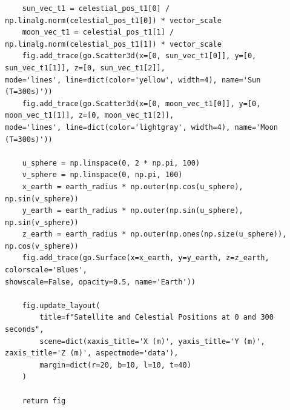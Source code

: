 \documentclass[11pt]{article}
\begin{document}
\begin{Verbatim}
    sun_vec_t1 = celestial_pos_t1[0] / np.linalg.norm(celestial_pos_t1[0]) * vector_scale
    moon_vec_t1 = celestial_pos_t1[1] / np.linalg.norm(celestial_pos_t1[1]) * vector_scale
    fig.add_trace(go.Scatter3d(x=[0, sun_vec_t1[0]], y=[0, sun_vec_t1[1]], z=[0, sun_vec_t1[2]],
mode='lines', line=dict(color='yellow', width=4), name='Sun (T=300s)'))
    fig.add_trace(go.Scatter3d(x=[0, moon_vec_t1[0]], y=[0, moon_vec_t1[1]], z=[0, moon_vec_t1[2]],
mode='lines', line=dict(color='lightgray', width=4), name='Moon (T=300s)'))

    u_sphere = np.linspace(0, 2 * np.pi, 100)
    v_sphere = np.linspace(0, np.pi, 100)
    x_earth = earth_radius * np.outer(np.cos(u_sphere), np.sin(v_sphere))
    y_earth = earth_radius * np.outer(np.sin(u_sphere), np.sin(v_sphere))
    z_earth = earth_radius * np.outer(np.ones(np.size(u_sphere)), np.cos(v_sphere))
    fig.add_trace(go.Surface(x=x_earth, y=y_earth, z=z_earth, colorscale='Blues',
showscale=False, opacity=0.5, name='Earth'))

    fig.update_layout(
        title=f"Satellite and Celestial Positions at 0 and 300 seconds",
        scene=dict(xaxis_title='X (m)', yaxis_title='Y (m)', zaxis_title='Z (m)', aspectmode='data'),
        margin=dict(r=20, b=10, l=10, t=40)
    )

    return fig
\end{Verbatim}
\end{document}
